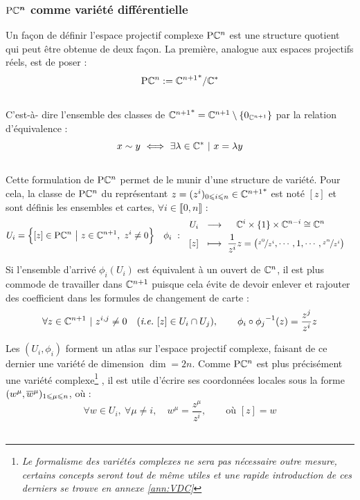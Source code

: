 \subsubsection{$\boldsymbol{\text{\normalfont P}\mathbb{C}^{n}}$ comme variété différentielle}

Un façon de définir l'espace projectif complexe $\text{\normalfont P}\mathbb{C}^{n}$ est une structure quotient qui peut être obtenue de deux façon. La première, analogue aux espaces projectifs réels, est de poser :
\[\text{\normalfont P}\mathbb{C}^{n} := {\mathbb{C}^{n+1}}^*/\mathbb{C}^*\]
\\
C'est-à- dire l'ensemble des classes de ${\mathbb{C}^{n+1}}^* = \mathbb{C}^{n+1} \setminus \{0_{\mathbb{C}^{n+1}}\}$ par la relation d'équivalence :
\[x \sim y\ \Llr\ \exists \lambda\in\C^*\ |\ x=\lambda y\]
\\
Cette formulation de $\text{\normalfont P}\mathbb{C}^{n}$ permet de le munir d'une structure de variété. Pour cela, la classe de $\text{\normalfont P}\mathbb{C}^{n}$ du représentant $z = (z^i)_{0\leqslant i\leqslant n}\in{\mathbb{C}^{n+1}}^*$ est noté $[z]$ et sont définis les ensembles et cartes, $\forall i\in\llbracket0,n\rrbracket$ :
\begin{align}
	U_i &= \Big\{[z]\in\text{\normalfont P}\mathbb{C}^{n}\ \big|\ z\in \mathbb{C}^{n+1},\ z^i\neq 0\Big\}  &  \phi_i\  :\quad &\begin{aligned}
		U_i\ \ &\longrightarrow\quad\ \mathbb{C}^{i}\times \{1\} \times\mathbb{C}^{n-i}\cong \mathbb{C}^{n} \\ [z]\ \ &\longmapsto\ \frac{1}{z^i}z = \big(\nicefrac{z^0}{z^i},\cdots, 1, \cdots, \nicefrac{z^n}{z^i}\big)
	\end{aligned}
\end{align}
\begin{remarque}
	Si l'ensemble d'arrivé $\phi_i(U_i)$ est équivalent à un ouvert de $\mathbb{C}^{n}$, il est plus commode de travailler dans $\mathbb{C}^{n+1}$ puisque cela évite de devoir enlever et rajouter des coefficient dans les formules de changement de carte :
	\[ \forall z\in\C^{n+1}\ |\ z^{i,j}\neq 0\quad (\ie~[z]\in U_i\cap U_j) ,\qquad \phi_i \circ {\phi_j}^{-1}(z) = \frac{z^j}{z^i}z\]
\end{remarque}
\skipl
Les $(U_i,\phi_i)$ forment un atlas sur l'espace projectif complexe, faisant de ce dernier une variété de dimension $\dim = 2n$. Comme $\text{\normalfont P}\mathbb{C}^{n}$ est plus précisément une variété complexe\footnote{\itshape
	Le formalisme des variétés complexes ne sera pas nécessaire outre mesure, certains concepts seront tout de même utiles et une rapide introduction de ces derniers se trouve en annexe \ref{ann:VDC}}
, il est utile d'écrire ses coordonnées locales sous la forme $(w^\mu, \overline{w}^\mu)_{1\leqslant \mu \leqslant n}$, où :
\[\forall w\in U_i,\ \forall \mu\neq i,\quad w^\mu = \frac{z^\mu}{z^i},\qquad  \text{où } [z] = w\]
 \\




